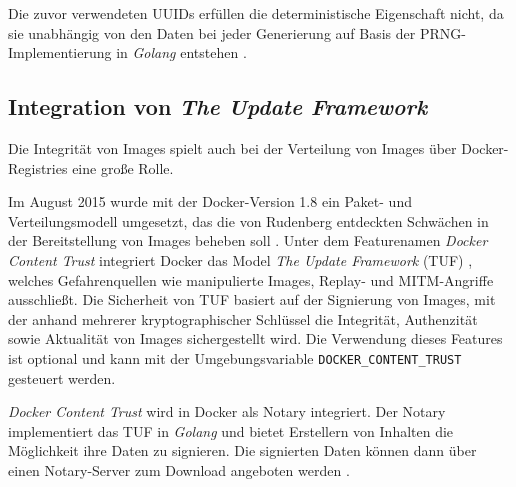 \documentclass[../main.tex]{subfiles}
\begin{document}
      Die zuvor verwendeten UUIDs erfüllen die deterministische Eigenschaft nicht, da sie unabhängig von den Daten bei jeder Generierung auf Basis der PRNG-Implementierung in \emph{Golang} entstehen \cite{https://github.com/docker/distribution/blob/master/uuid/uuid.go}\cite{https://golang.org/pkg/crypto/rand/}.




    \subsection{Integration von \emph{The Update Framework}}
    \label{tuf}
      Die Integrität von Images spielt auch bei der Verteilung von Images über Docker-Registries eine große Rolle.

      Im August 2015 wurde mit der Docker-Version 1.8 ein Paket- und Verteilungsmodell umgesetzt, das die von Rudenberg entdeckten Schwächen in der Bereitstellung von Images beheben soll \cite{dockerContentTrust}. Unter dem Featurenamen \emph{Docker Content Trust} integriert Docker das Model \emph{The Update Framework} (TUF) \cite{tufFramework}, welches Gefahrenquellen wie manipulierte Images, Replay- und MITM-Angriffe ausschließt. Die Sicherheit von TUF basiert auf der Signierung von Images, mit der anhand mehrerer kryptographischer Schlüssel die Integrität, Authenzität sowie Aktualität von Images sichergestellt wird. Die Verwendung dieses Features ist optional und kann mit der Umgebungsvariable \texttt{DOCKER\_CONTENT\_TRUST} gesteuert werden.

      \emph{Docker Content Trust} wird in Docker als Notary integriert. Der Notary implementiert das TUF in \emph{Golang} und bietet Erstellern von Inhalten die Möglichkeit ihre Daten zu signieren. Die signierten Daten können dann über einen Notary-Server zum Download angeboten werden \cite{githubNotary}\cite{dockerContentTrust}.
\end{document}
